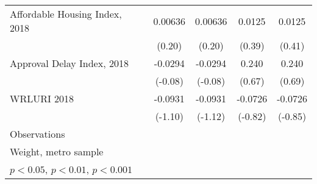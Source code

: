 \begin{table}[htbp]
\begin{tabular}{l*{4}{c}}
\addlinespace
Affordable Housing Index, 2018&     0.00636         &     0.00636         &      0.0125         &      0.0125         \\
                    &      (0.20)         &      (0.20)         &      (0.39)         &      (0.41)         \\
\addlinespace
Approval Delay Index, 2018&     -0.0294         &     -0.0294         &       0.240         &       0.240         \\
                    &     (-0.08)         &     (-0.08)         &      (0.67)         &      (0.69)         \\
\addlinespace
WRLURI 2018         &     -0.0931         &     -0.0931         &     -0.0726         &     -0.0726         \\
                    &     (-1.10)         &     (-1.12)         &     (-0.82)         &     (-0.85)         \\
\midrule
Observations        &                     &                     &                     &                     \\
\bottomrule
\multicolumn{5}{l}{\footnotesize Weight, metro sample}\\
\multicolumn{5}{l}{\footnotesize \sym{*} \(p<0.05\), \sym{**} \(p<0.01\), \sym{***} \(p<0.001\)}\\
\end{tabular}
\end{table}
